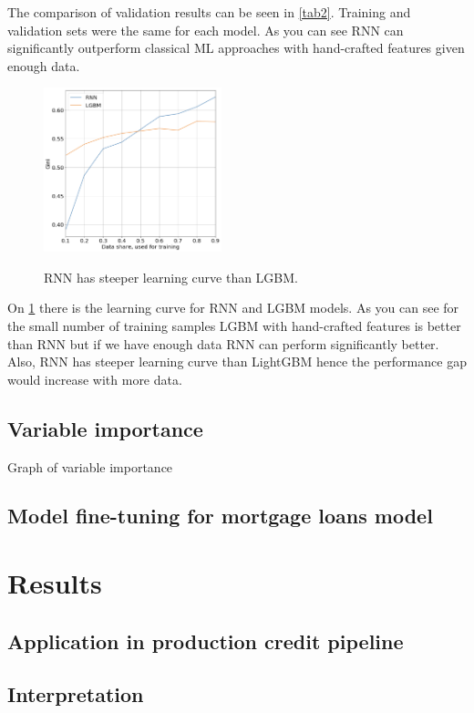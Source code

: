 \documentclass{sigkddExp}
\begin{document}
The comparison of validation results can be seen in \ref{tab2}. Training and validation sets were the same for each model.  As you can see RNN can significantly outperform classical ML approaches with hand-crafted features given enough data.

\begin{figure}
  \caption{RNN has steeper learning curve than LGBM.}
  \includegraphics[width=0.46\textwidth]{learning-curve.png}
  \label{fig1}
\end{figure}

On \ref{fig1} there is the learning curve for RNN and LGBM models. As you can see for the small number of training samples LGBM with hand-crafted features is better than RNN but if we have enough data RNN can perform significantly better. Also, RNN has steeper learning curve than LightGBM hence the performance gap would increase with more data.

\subsection{Variable importance}

Graph of variable importance

\subsection{Model fine-tuning for mortgage loans model}

\section{Results}

\subsection{Application in production credit pipeline}

\subsection{Interpretation}
\end{document}
